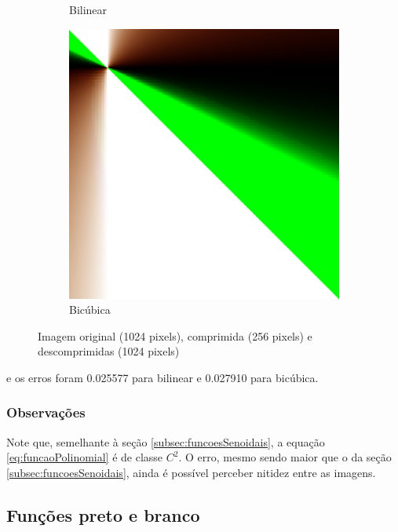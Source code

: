 \documentclass{article}
\begin{document}
\begin{figure}[ht]
\begin{subfigure}{0.23\textwidth}
    \caption{Bilinear}
  \end{subfigure}%
  \hfill
  \begin{subfigure}{0.23\textwidth}
    \centering
    \includegraphics[width=\textwidth]{polinomial/h-10/decompressed-bicubica.png}
    \caption{Bicúbica}
  \end{subfigure}
  \caption{Imagem original (1024 pixels), comprimida (256 pixels) e descomprimidas (1024 pixels)}
\end{figure}

e os erros foram 0.025577 para bilinear e 0.027910 para bicúbica.

\subsubsection{Observações}

Note que, semelhante à seção \ref{subsec:funcoesSenoidais},
a equação \ref{eq:funcaoPolinomial} é de classe $C^2$. O erro,
mesmo sendo maior que o da seção \ref{subsec:funcoesSenoidais},
ainda é possível perceber nitidez entre as imagens.

\subsection{Funções preto e branco}
\end{document}
